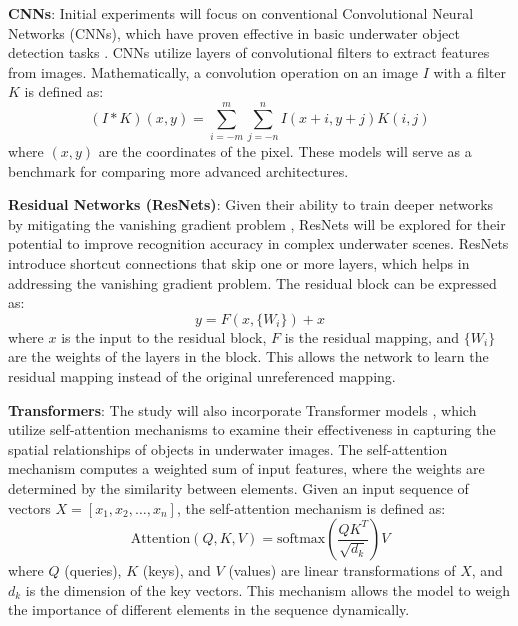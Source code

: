 \begin{APAitemize}
    \item \textbf{CNNs}: Initial experiments will focus on conventional
     Convolutional Neural Networks (CNNs), which have proven effective in basic underwater object
     detection tasks \parencite{hanUnderwaterImageProcessing2020}. 
     CNNs utilize layers of convolutional filters to extract features from images. 
     Mathematically, a convolution operation on an image \( I \) with a filter \( K \) 
     is defined as:
     \begin{equation}
     (I * K)(x,y) = \sum_{i=-m}^{m} \sum_{j=-n}^{n} I(x+i, y+j) K(i, j)
     \end{equation}
     where \( (x, y) \) are the coordinates of the pixel. 
     These models will serve as a benchmark for comparing more advanced architectures.

    \item \textbf{Residual Networks (ResNets)}: Given their ability to train
     deeper networks by mitigating the vanishing gradient problem \parencite{heDeepResidualLearning2016},
     ResNets will be explored for their potential to improve recognition accuracy in complex underwater scenes.
     ResNets introduce shortcut connections that skip one or more layers, which helps in addressing the vanishing gradient problem. 
     The residual block can be expressed as:
     \begin{equation}
     y = F(x, \{W_i\}) + x
     \end{equation}
     where \( x \) is the input to the residual block, \( F \) is the residual mapping, and \( \{W_i\} \) are the weights of the layers in the block. This allows the network to learn the residual mapping instead of the original unreferenced mapping.

     \item \textbf{Transformers}: The study will also incorporate Transformer
     models \parencite{hanSurveyVisionTransformer2023}, which utilize self-attention mechanisms to examine their
     effectiveness in capturing the spatial relationships of objects in underwater images.
     The self-attention mechanism computes a weighted sum of input features, where the weights are determined by the similarity between elements.
     Given an input sequence of vectors \( X = [x_1, x_2, \ldots, x_n] \), the self-attention mechanism is defined as:
     \begin{equation}
     \text{Attention}(Q, K, V) = \text{softmax}\left(\frac{QK^T}{\sqrt{d_k}}\right)V
     \end{equation}
     where \( Q \) (queries), \( K \) (keys), and \( V \) (values) are linear transformations of \( X \), and \( d_k \) is the dimension of the key vectors. This mechanism allows the model to weigh the importance of different elements in the sequence dynamically.
\end{APAitemize}

